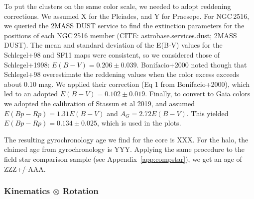 \documentclass[12pt,twocolumn,tighten]{aastex63}
\begin{document}
To put the clusters on the same color scale, we needed to adopt
reddening corrections.
We assumed {X} for the Pleiades, and {Y} for Praesepe.
For NGC\,2516, we queried the 2MASS DUST service to find the
extinction parameters for the positions of each NGC\,2516 member
(CITE: astrobase.services.dust; 2MASS DUST).  The mean and standard
deviation of the E(B-V) values for the Schlegel+98 and SF11 maps were
consistent, so we considered those of Schlegel+1998:
$E(B-V)=0.206\pm0.039$.  Bonifacio+2000 noted though that Schlegel+98
overestimate the reddening values when the color excess exceeds about
0.10 mag. We applied their correction (Eq 1 from Bonifacio+2000),
which led to an adopted $E(B-V)=0.102\pm0.019$.  Finally, to convert
to Gaia colors we adopted the calibration of Stassun et al 2019, and
assumed $E(Bp-Rp)=1.31 E(B-V)$ and $A_G=2.72 E(B-V)$.  This yielded
$E(Bp-Rp)=0.134\pm0.025$, which is used in the plots.


The resulting gyrochronology age we find for the core is XXX.
For the halo, the claimed age from gyrochronology is YYY.
Applying the same procedure to the field star comparison sample (see
Appendix~\ref{app:compstar}),
we get an age of ZZZ+/-AAA.

\subsubsection{Kinematics $\otimes$ Rotation}
\end{document}
